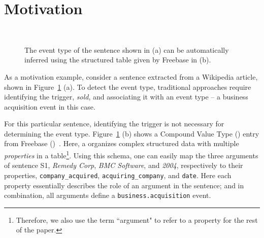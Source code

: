 \section{Motivation}
\begin{figure}
  \centering
   \\
  \caption{The event type of the sentence shown in (a) can be automatically inferred using the structured table given by Freebase in (b).}
  \label{fig:example}
\end{figure}


As a motivation example, consider a sentence extracted from a Wikipedia article, shown in Figure~\ref{fig:example} (a). To detect the event
type, traditional approaches require identifying the trigger, \emph{sold}, and associating it with an event type -- a business acquisition
event in this case.


For this particular sentence, identifying the trigger is not necessary for determining the event type. Figure~\ref{fig:example} (b) shows a
Compound Value Type (\CVT) entry from Freebase (\FB)~\cite{bollacker2008freebase}. Here, a \CVT organizes complex structured data with
multiple \emph{properties} in a table\footnote{Therefore, we also use the term ``argument" to refer to a \CVT property for the rest of the
paper.}. Using this \CVT schema, one can easily map the three arguments of sentence S1, \emph{Remedy Corp}, \emph{BMC Software}, and
\emph{2004}, respectively to their properties, \texttt{company\_acquired}, \texttt{acquiring\_company}, and \texttt{date}. Here each
property essentially describes the role of an argument in the sentence; and in combination, all arguments define a
\texttt{business.acquisition} event.

